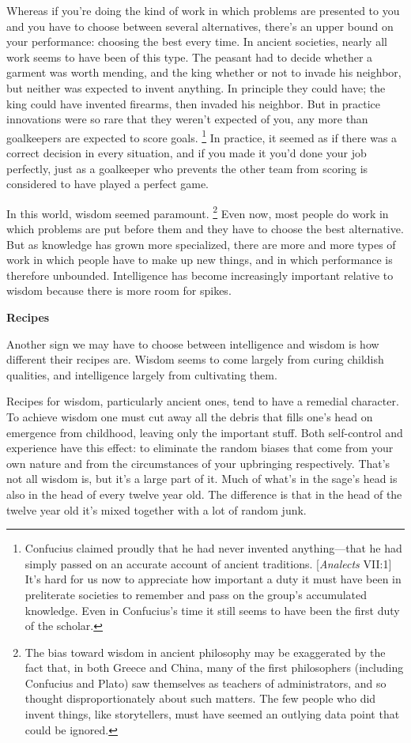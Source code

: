 \documentclass[12pt]{book}
\begin{document}
Whereas if you're doing the kind of work in which problems are presented
to you and you have to choose between several alternatives, there's an
upper bound on your performance: choosing the best every time. In
ancient societies, nearly all work seems to have been of this type. The
peasant had to decide whether a garment was worth mending, and the king
whether or not to invade his neighbor, but neither was expected to
invent anything. In principle they could have; the king could have
invented firearms, then invaded his neighbor. But in practice
innovations were so rare that they weren't expected of you, any more
than goalkeepers are expected to score goals. \footnote{Confucius claimed proudly that he had never invented
anything---that he had simply passed on an accurate account of ancient
traditions. {[}\emph{Analects} VII:1{]} It's hard for us now to
appreciate how important a duty it must have been in preliterate
societies to remember and pass on the group's accumulated knowledge.
Even in Confucius's time it still seems to have been the first duty of
the scholar.} In
practice, it seemed as if there was a correct decision in every
situation, and if you made it you'd done your job perfectly, just as a
goalkeeper who prevents the other team from scoring is considered to
have played a perfect game.

In this world, wisdom seemed paramount. \footnote{The bias toward wisdom in ancient philosophy may be exaggerated
by the fact that, in both Greece and China, many of the first
philosophers (including Confucius and Plato) saw themselves as teachers
of administrators, and so thought disproportionately about such matters.
The few people who did invent things, like storytellers, must have
seemed an outlying data point that could be ignored.} Even
now, most people do work in which problems are put before them and they
have to choose the best alternative. But as knowledge has grown more
specialized, there are more and more types of work in which people have
to make up new things, and in which performance is therefore unbounded.
Intelligence has become increasingly important relative to wisdom
because there is more room for spikes.

\textbf{Recipes}

Another sign we may have to choose between intelligence and wisdom is
how different their recipes are. Wisdom seems to come largely from
curing childish qualities, and intelligence largely from cultivating
them.

Recipes for wisdom, particularly ancient ones, tend to have a remedial
character. To achieve wisdom one must cut away all the debris that fills
one's head on emergence from childhood, leaving only the important
stuff. Both self-control and experience have this effect: to eliminate
the random biases that come from your own nature and from the
circumstances of your upbringing respectively. That's not all wisdom is,
but it's a large part of it. Much of what's in the sage's head is also
in the head of every twelve year old. The difference is that in the head
of the twelve year old it's mixed together with a lot of random junk.
\end{document}
